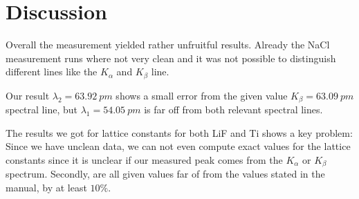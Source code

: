 \section{Discussion}
\label{sec:discussion}
Overall the measurement yielded rather unfruitful results. Already the NaCl measurement runs where
not very clean and it was not possible to distinguish different lines like the $K_\alpha$ and
$K_\beta$ line. 

Our result $\lambda_2 = \SI{63.92}{pm}$ shows a small error from the given value $K_\beta =
\SI{63.09}{pm}$
spectral line, but $\lambda_1 = \SI{54.05}{pm}$ is far off from both relevant spectral lines.

The results we got for lattice constants for both LiF and Ti shows a key problem: Since we have
unclean data, we can not even compute exact values for the lattice constants since it is unclear if
our measured peak comes from the $K_\alpha$ or $K_\beta$ spectrum. Secondly, are all given values
far of from the values stated in the manual, by at least $10\%$.

